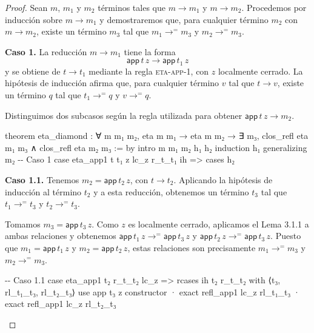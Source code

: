 \documentclass[
  spanish,
  letterpaper,
  DIV=11,
  numbers=noendperiod]{scrreprt}
\newenvironment{Shaded}{\begin{snugshade}}{\end{snugshade}}
\newcommand{\CommentTok}[1]{\textcolor[rgb]{0.37,0.37,0.37}{#1}}
\newcommand{\KeywordTok}[1]{\textcolor[rgb]{0.00,0.23,0.31}{\textbf{#1}}}
\newcommand{\NormalTok}[1]{\textcolor[rgb]{0.00,0.23,0.31}{#1}}
\renewcommand{\NormalTok}[1]{\textcolor[HTML]{000000}{#1}}
\renewcommand{\KeywordTok}[1]{\textcolor[HTML]{0000FF}{#1}}
\renewcommand{\CommentTok}[1]{\textcolor[HTML]{008000}{#1}}
\theoremstyle{remark}
\begin{document}
\begin{proof}
Sean \(m\), \(m_1\) y \(m_2\) términos tales que
\(m \longrightarrow m_1\) y \(m \longrightarrow m_2\). Procedemos por
inducción sobre \(m \longrightarrow m_1\) y demostraremos que, para
cualquier término \(m_2\) con \(m \longrightarrow m_2\), existe un
término \(m_3\) tal que \(m_1 \longrightarrow^{=} m_3\) y
\(m_2 \longrightarrow^{=} m_3\).

\textbf{Caso 1.} La reducción \(m\longrightarrow m_1\) tiene la forma \[
\mathsf{app}\,t\,z \longrightarrow \mathsf{app}\,t_1\,z
\] y se obtiene de \(t\longrightarrow t_1\) mediante la regla
\textsc{eta-app-1}, con \(z\) localmente cerrado. La hipótesis de
inducción afirma que, para cualquier término \(v\) tal que
\(t\longrightarrow v\), existe un término \(q\) tal que
\(t_1\longrightarrow^{=} q\) y \(v\longrightarrow^{=} q\).

Distinguimos dos subcasos según la regla utilizada para obtener
\(\mathsf{app}\,t\,z\longrightarrow m_2\).

\begin{Shaded}
\begin{Highlighting}[]
\KeywordTok{theorem}\NormalTok{ eta\_diamond : ∀ m m₁ m₂,}
\NormalTok{    eta m m₁ → eta m m₂ →}
\NormalTok{    ∃ m₃, clos\_refl eta m₁ m₃ ∧ clos\_refl eta m₂ m₃ := }\KeywordTok{by}
\NormalTok{  intro m m₁ m₂ h₁ h₂}
\NormalTok{  induction h₁ generalizing m₂}
  \CommentTok{{-}{-} Caso 1}
\NormalTok{  case eta\_app1 t t₁ z lc\_z r\_t\_t₁ ih =\textgreater{}}
\NormalTok{    cases h₂}
\end{Highlighting}
\end{Shaded}

\textbf{Caso 1.1.} Tenemos \(m_2=\mathsf{app}\,t_2\,z\), con
\(t\longrightarrow t_2\). Aplicando la hipótesis de inducción al término
\(t_2\) y a esta reducción, obtenemos un término \(t_3\) tal que
\(t_1\longrightarrow^{=}t_3\) y \(t_2\longrightarrow^{=}t_3\).

Tomamos \(m_3=\mathsf{app}\,t_3\,z\). Como \(z\) es localmente cerrado,
aplicamos el Lema 3.1.1 a ambas relaciones y obtenemos
\(\mathsf{app}\,t_1\,z\longrightarrow^{=}\mathsf{app}\,t_3\,z\) y
\(\mathsf{app}\,t_2\,z\longrightarrow^{=}\mathsf{app}\,t_3\,z\). Puesto
que \(m_1=\mathsf{app}\,t_1\,z\) y \(m_2=\mathsf{app}\,t_2\,z\), estas
relaciones son precisamente \(m_1\longrightarrow^{=}m_3\) y
\(m_2\longrightarrow^{=}m_3\).

\begin{Shaded}
\begin{Highlighting}[]
    \CommentTok{{-}{-} Caso 1.1}
\NormalTok{    case eta\_app1 t₂ r\_t\_t₂ lc\_z =\textgreater{}}
\NormalTok{      rcases ih t₂ r\_t\_t₂ }\KeywordTok{with}\NormalTok{ ⟨t₃, rl\_t₁\_t₃, rl\_t₂\_t₃⟩}
\NormalTok{      use app t₃ z}
\NormalTok{      constructor}
\NormalTok{      · }\KeywordTok{exact}\NormalTok{ refl\_app1 lc\_z rl\_t₁\_t₃}
\NormalTok{      · }\KeywordTok{exact}\NormalTok{ refl\_app1 lc\_z rl\_t₂\_t₃}
\end{Highlighting}
\end{Shaded}


\end{proof}
\end{document}
